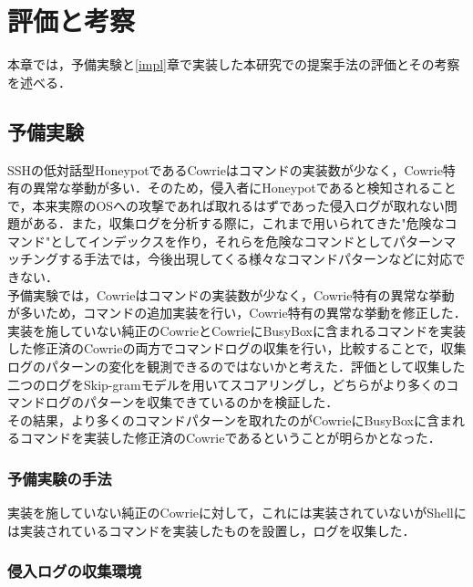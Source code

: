 \chapter{評価と考察}
\label{eval}

本章では，予備実験と\ref{impl}章で実装した本研究での提案手法の評価とその考察を述べる．

\section{予備実験}
\label{eval:first}

SSHの低対話型HoneypotであるCowrieはコマンドの実装数が少なく，Cowrie特有の異常な挙動が多い．そのため，侵入者にHoneypotであると検知されることで，本来実際のOSへの攻撃であれば取れるはずであった侵入ログが取れない問題がある．また，収集ログを分析する際に，これまで用いられてきた"危険なコマンド"としてインデックスを作り，それらを危険なコマンドとしてパターンマッチングする手法では，今後出現してくる様々なコマンドパターンなどに対応できない．\\
予備実験では，Cowrieはコマンドの実装数が少なく，Cowrie特有の異常な挙動が多いため，コマンドの追加実装を行い，Cowrie特有の異常な挙動を修正した．実装を施していない純正のCowrieとCowrieにBusyBoxに含まれるコマンドを実装した修正済のCowrieの両方でコマンドログの収集を行い，比較することで，収集ログのパターンの変化を観測できるのではないかと考えた．評価として収集した二つのログをSkip-gramモデルを用いてスコアリングし，どちらがより多くのコマンドログのパターンを収集できているのかを検証した．\\
その結果，より多くのコマンドパターンを取れたのがCowrieにBusyBoxに含まれるコマンドを実装した修正済のCowrieであるということが明らかとなった．

\subsection{予備実験の手法}
\label{eval:appr}
実装を施していない純正のCowrieに対して，これには実装されていないがShellには実装されているコマンドを実装したものを設置し，ログを収集した．

\subsection{侵入ログの収集環境}
\label{eval:apprenv}


